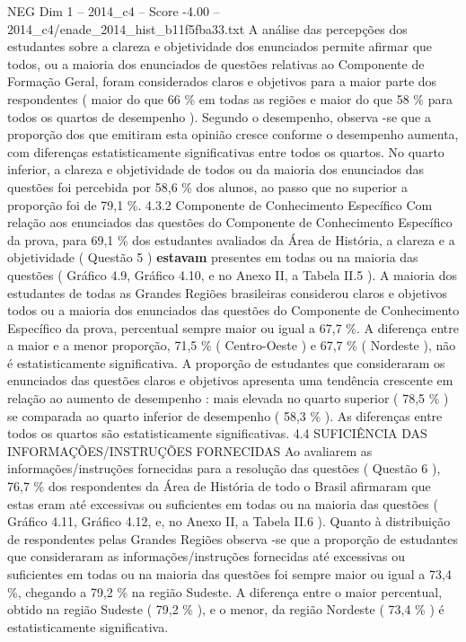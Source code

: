\begin{textsample}{NEG Dim 1 – 2014\_c4 – Score -4.00 – 2014\_c4/enade\_2014\_hist\_b11f5fba33.txt}
A análise das percepções dos estudantes sobre a clareza e objetividade dos enunciados permite afirmar que todos, ou a maioria dos enunciados de questões relativas ao Componente de Formação Geral, foram considerados claros e objetivos para a maior parte dos respondentes ( maior do que 66 \% em todas as regiões e maior do que 58 \% para todos os quartos de desempenho ).
Segundo o desempenho, observa -se que a proporção dos que emitiram esta opinião cresce conforme o desempenho aumenta, com diferenças estatisticamente significativas entre todos os quartos.
No quarto inferior, a clareza e objetividade de todos ou da maioria dos enunciados das questões foi percebida por 58,6 \% dos alunos, ao passo que no superior a proporção foi de 79,1 \%. 4.3.2 Componente de Conhecimento Específico Com relação aos enunciados das questões do Componente de Conhecimento Específico da prova, para 69,1 \% dos estudantes avaliados da Área de História, a clareza e a objetividade ( Questão 5 ) \textbf{estavam} presentes em todas ou na maioria das questões ( Gráfico 4.9, Gráfico 4.10, e no Anexo II, a Tabela II.5 ).
A maioria dos estudantes de todas as Grandes Regiões brasileiras considerou claros e objetivos todos ou a maioria dos enunciados das questões do Componente de Conhecimento Específico da prova, percentual sempre maior ou igual a 67,7 \%.
A diferença entre a maior e a menor proporção, 71,5 \% ( Centro-Oeste ) e 67,7 \% ( Nordeste ), não é estatisticamente significativa.
A proporção de estudantes que consideraram os enunciados das questões claros e objetivos apresenta uma tendência crescente em relação ao aumento de desempenho : mais elevada no quarto superior ( 78,5 \% ) se comparada ao quarto inferior de desempenho ( 58,3 \% ).
As diferenças entre todos os quartos são estatisticamente significativas. 4.4 SUFICIÊNCIA DAS INFORMAÇÕES/INSTRUÇÕES FORNECIDAS Ao avaliarem as informações/instruções fornecidas para a resolução das questões ( Questão 6 ), 76,7 \% dos respondentes da Área de História de todo o Brasil afirmaram que estas eram até excessivas ou suficientes em todas ou na maioria das questões ( Gráfico 4.11, Gráfico 4.12, e, no Anexo II, a Tabela II.6 ).
Quanto à distribuição de respondentes pelas Grandes Regiões observa -se que a proporção de estudantes que consideraram as informações/instruções fornecidas até excessivas ou suficientes em todas ou na maioria das questões foi sempre maior ou igual a 73,4 \%, chegando a 79,2 \% na região Sudeste.
A diferença entre o maior percentual, obtido na região Sudeste ( 79,2 \% ), e o menor, da região Nordeste ( 73,4 \% ) é estatisticamente significativa.

\end{textsample}
